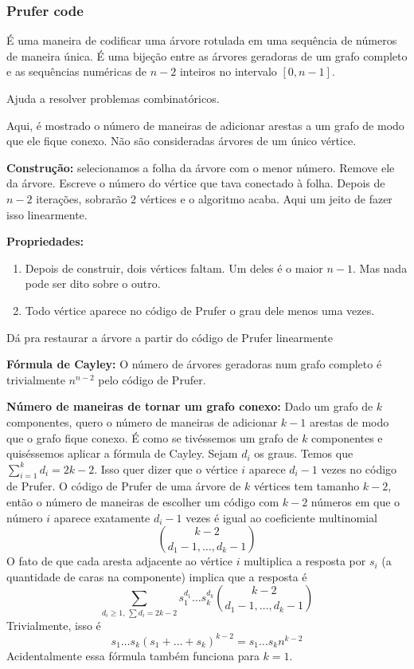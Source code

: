 \subsubsection{Prufer code}

É uma maneira de codificar uma árvore rotulada em uma sequência de números
de maneira única. É uma bijeção entre as árvores geradoras de um grafo completo
e as sequências numéricas de $n-2$ inteiros no intervalo $[0, n-1]$.

Ajuda a resolver problemas combinatóricos.

Aqui, é mostrado o número de maneiras de adicionar arestas a um grafo de modo
que ele fique conexo. Não são consideradas árvores de um único vértice.

\textbf{Construção:} selecionamos a folha da árvore com o menor número. Remove
ele da árvore. Escreve o número do vértice que tava conectado à folha. Depois
de $n-2$ iterações, sobrarão $2$ vértices e o algoritmo acaba. Aqui um jeito
de fazer isso linearmente.


\textbf{Propriedades:}

\begin{enumerate}
    \item Depois de construir, dois vértices faltam. Um deles é o maior $n-1$. Mas
    nada pode ser dito sobre o outro.
    \item Todo vértice aparece no código de Prufer o grau dele menos uma vezes.
\end{enumerate}

Dá pra restaurar a árvore a partir do código de Prufer linearmente


\textbf{Fórmula de Cayley:} O número de árvores geradoras num grafo completo é
trivialmente $n^{n-2}$ pelo código de Prufer.

\textbf{Número de maneiras de tornar um grafo conexo:} Dado um grafo de $k$ componentes,
quero o número de maneiras de adicionar $k-1$ arestas de modo que o grafo fique conexo.
É como se tivéssemos um grafo de $k$ componentes e quiséssemos aplicar a fórmula de Cayley.
Sejam $d_i$ os graus. Temos que $\sum\limits_{i=1}^k d_i = 2k-2$. Isso quer dizer que o vértice
$i$ aparece $d_i-1$ vezes no código de Prufer. O código de Prufer de uma árvore de $k$ vértices
tem tamanho $k-2$, então o número de maneiras de escolher um código com $k-2$ números em que
o número $i$ aparece exatamente $d_i-1$ vezes é igual ao coeficiente multinomial
$$ \binom{k-2}{d_1 - 1, \dots, d_k-1}$$
O fato de que cada aresta adjacente ao vértice $i$ multiplica a resposta por $s_i$ (a quantidade de
caras na componente) implica que a resposta é
$$ \sum\limits_{d_i \geq 1, \, \sum d_i = 2k-2} s_1^{d_1} \dots s_k^{d_k} \binom{k-2}{d_1 - 1, \dots, d_k-1}$$
Trivialmente, isso é
$$ s_1 \dots s_k (s_1 + \dots + s_k)^{k-2} = s_1 \dots s_k n^{k-2}$$
Acidentalmente essa fórmula também funciona para $k=1$.